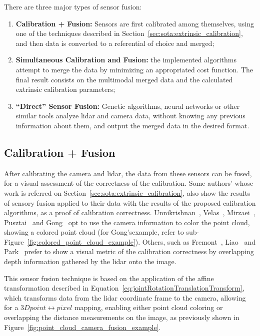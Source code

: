 There are three major types of sensor fusion: 

\begin{enumerate}
	\item \textbf{Calibration + Fusion:} Sensors are first calibrated among themselves, using one of the techniques described in Section~\ref{sec:sota:extrinsic_calibration}, and then data is converted to a referential of choice and merged;
	\item \textbf{Simultaneous Calibration and Fusion:} the implemented algorithms attempt to merge the data by minimizing an appropriated cost function. The final result consists on the multimodal merged data and the calculated extrinsic calibration parameters;
	\item \textbf{``Direct'' Sensor Fusion:} Genetic algorithms, neural networks or other similar tools analyze \ac{lidar} and camera data, without knowing any previous information about them, and output the merged data in the desired format.
\end{enumerate} 


\subsection{Calibration + Fusion}
\label{subsec:sota:calibration-and-fusion}
After calibrating the camera and \ac{lidar}, the data from these sensors can be fused, for a visual assessment of the correctness of the calibration. Some authors' whose work is referred on Section~\ref{sec:sota:extrinsic_calibration}, also show the results of sensory fusion applied to their data with the results of the proposed calibration algorithms, as a proof of calibration correctness. Unnikrishnan\etal~\cite{Unnikrishnan2005}, Velas\etal~\cite{MartinVelas2013}, Mirzaei\etal~\cite{Mirzaei2012}, Pusztai\etal~\cite{Pusztai2018} and Gong\etal~\cite{Gong2013} opt to use the camera information to color the point cloud, showing a colored point cloud (for Gong's\etal example, refer to sub-Figure~\ref{fig:colored_point_cloud_example}). Others, such as Fremont\etal~\cite{Fremont2013}, Liao\etal~\cite{Liao2019} and Park\etal~\cite{Park2014} prefer to show a visual metric of the calibration correctness by overlapping depth information gathered by the \ac{lidar} onto the image.

This sensor fusion technique is based on the application of the affine transformation described in Equation~\eqref{eq:jointRotationTranslationTransform}, which transforms data from the \ac{lidar} coordinate frame to the camera, allowing for a $3D point \leftrightarrow pixel$ mapping, enabling either point cloud coloring or overlapping the distance measurements on the image, as previously shown in Figure~\ref{fig:point_cloud_camera_fusion_example}.
	
